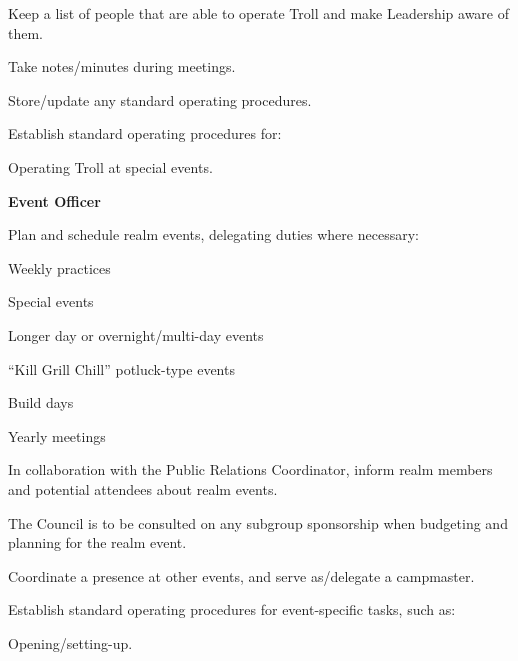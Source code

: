 \documentclass[12pt]{article}
\begin{document}
\begin{level}
\begin{level}
\begin{level}
            \begin{level}
                \item Keep a list of people that are able to operate Troll and make Leadership aware of them.
            \end{level}
            \item Take notes/minutes during meetings.
            \item Store/update any standard operating procedures.
            \item Establish standard operating procedures for:
            \begin{level}
                \item Operating Troll at special events.
            \end{level}
        \end{level}
        \item \textbf{Event Officer}
        \begin{level}
            \item Plan and schedule realm events, delegating duties where necessary:
            \begin{level}
                \item Weekly practices
                \item Special events
                \begin{level}
                    \item Longer day or overnight/multi-day events
                    \item “Kill Grill Chill” potluck-type events
                \end{level}
                \item Build days
                \item Yearly meetings
            \end{level}
            \item In collaboration with the Public Relations Coordinator, inform realm members and potential attendees about realm events.
            \item The Council is to be consulted on any subgroup sponsorship when budgeting and planning for the realm event.
            \item Coordinate a presence at other events, and serve as/delegate a campmaster.
            \item Establish standard operating procedures for event-specific tasks, such as:
            \begin{level}
                \item Opening/setting-up.

\end{level}
\end{level}
\end{level}
\end{level}
\end{document}
